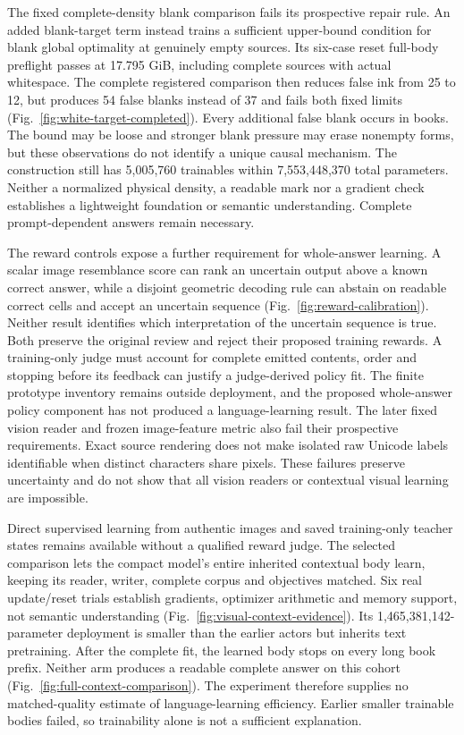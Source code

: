 The fixed complete-density blank comparison fails its prospective repair rule.
An added blank-target term instead trains a sufficient upper-bound condition
for blank global optimality at genuinely empty sources. Its six-case reset
full-body preflight passes at 17.795 GiB, including complete sources with actual
whitespace. The complete registered comparison then reduces false ink from
25 to 12, but produces 54 false blanks instead of 37 and fails both fixed limits
(Fig.~\ref{fig:white-target-completed}). Every additional false blank occurs in
books. The bound may be loose and stronger blank pressure may erase nonempty
forms, but these observations do not identify a unique causal mechanism.
The construction still has 5,005,760 trainables within 7,553,448,370 total
parameters. Neither a normalized physical density, a readable mark nor a
gradient check establishes a lightweight foundation or semantic understanding.
Complete prompt-dependent answers remain necessary.

The reward controls expose a further requirement for whole-answer learning.
A scalar image resemblance score can rank an uncertain output above a known
correct answer, while a disjoint geometric decoding rule can abstain on readable
correct cells and accept an uncertain sequence (Fig.~\ref{fig:reward-calibration}).
Neither result identifies which interpretation of the uncertain sequence is
true. Both preserve the original review and reject their proposed training
rewards. A training-only judge must account for complete emitted contents,
order and stopping before its feedback can justify a judge-derived policy fit. The
finite prototype inventory remains outside deployment, and the proposed
whole-answer policy component has not produced a language-learning result.
The later fixed vision reader and frozen image-feature metric also fail their
prospective requirements. Exact source rendering does not make isolated raw
Unicode labels identifiable when distinct characters share pixels. These
failures preserve uncertainty and do not show that all vision readers or
contextual visual learning are impossible.

Direct supervised learning from authentic images and saved training-only
teacher states remains available without a qualified reward judge. The selected
comparison lets the compact model's entire inherited contextual body learn,
keeping its reader, writer, complete corpus and objectives matched. Six real
update/reset trials establish gradients, optimizer arithmetic and memory
support, not semantic understanding (Fig.~\ref{fig:visual-context-evidence}).
Its 1,465,381,142-parameter deployment is smaller than the earlier actors but
inherits text pretraining. After the complete fit, the learned body stops on every long book prefix.
Neither arm produces a readable complete answer on this cohort
(Fig.~\ref{fig:full-context-comparison}). The experiment therefore supplies
no matched-quality estimate of language-learning efficiency. Earlier smaller trainable
bodies failed, so trainability alone is not a sufficient explanation.

